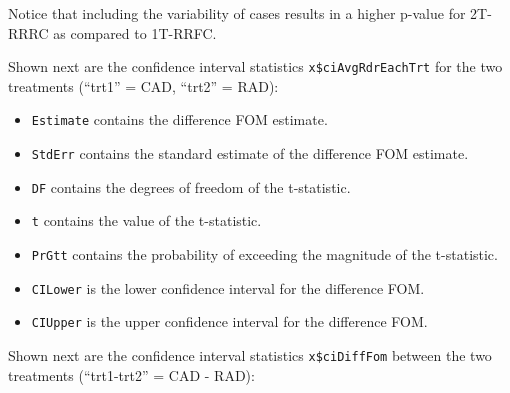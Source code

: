 \documentclass[
]{book}
\newenvironment{Shaded}{\begin{snugshade}}{\end{snugshade}}
\newcommand{\CommentTok}[1]{\textcolor[rgb]{0.56,0.35,0.01}{\textit{#1}}}
\newcommand{\KeywordTok}[1]{\textcolor[rgb]{0.13,0.29,0.53}{\textbf{#1}}}
\newcommand{\NormalTok}[1]{#1}
\newcommand{\OperatorTok}[1]{\textcolor[rgb]{0.81,0.36,0.00}{\textbf{#1}}}
\providecommand{\tightlist}{%
  \setlength{\itemsep}{0pt}\setlength{\parskip}{0pt}}
\begin{document}
Notice that including the variability of cases results in a higher p-value for 2T-RRRC as compared to 1T-RRFC.

Shown next are the confidence interval statistics \texttt{x\$ciAvgRdrEachTrt} for the two treatments (``trt1'' = CAD, ``trt2'' = RAD):

\begin{Shaded}
\end{Shaded}

\begin{itemize}
\tightlist
\item
  \texttt{Estimate} contains the difference FOM estimate.
\item
  \texttt{StdErr} contains the standard estimate of the difference FOM estimate.
\item
  \texttt{DF} contains the degrees of freedom of the t-statistic.
\item
  \texttt{t} contains the value of the t-statistic.
\item
  \texttt{PrGtt} contains the probability of exceeding the magnitude of the t-statistic.
\item
  \texttt{CILower} is the lower confidence interval for the difference FOM.
\item
  \texttt{CIUpper} is the upper confidence interval for the difference FOM.
\end{itemize}

Shown next are the confidence interval statistics \texttt{x\$ciDiffFom} between the two treatments (``trt1-trt2'' = CAD - RAD):

\begin{Shaded}
\end{Shaded}
\end{document}
